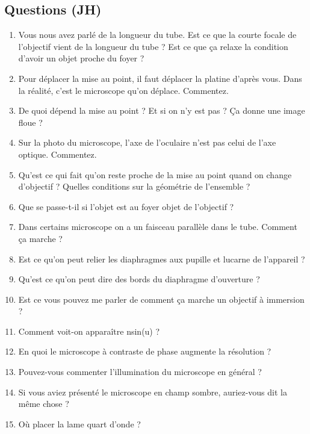 \subsection*{Questions (JH)}

\begin{enumerate}
\item Vous nous avez parlé de la longueur du tube. Est ce que la courte focale de l'objectif vient de la longueur du tube ? Est ce que ça relaxe la condition d'avoir un objet proche du foyer ?
\item Pour déplacer la mise au point, il faut déplacer la platine d'après vous. Dans la réalité, c'est le microscope qu'on déplace. Commentez.
\item De quoi dépend la mise au point ? Et si on n'y est pas ? Ça donne une image floue ?
\item Sur la photo du microscope, l'axe de l'oculaire n'est pas celui de l'axe optique. Commentez.
\item Qu'est ce qui fait qu'on reste proche de la mise au point quand on change d'objectif ? Quelles conditions sur la géométrie de l'ensemble ?
\item Que se passe-t-il si l'objet est au foyer objet de l'objectif ?
\item Dans certains microscope on a un faisceau parallèle dans le tube. Comment ça marche ?
\item Est ce qu'on peut relier les diaphragmes aux pupille et lucarne de l'appareil ?
\item Qu'est ce qu'on peut dire des bords du diaphragme d'ouverture ?
\item Est ce vous pouvez me parler de comment ça marche un objectif à immersion ?
\item Comment voit-on apparaître nsin(u) ?
\item En quoi le microscope à contraste de phase augmente la résolution ?
\item Pouvez-vous commenter l'illumination du microscope en général ?
\item Si vous aviez présenté le microscope en champ sombre, auriez-vous dit la même chose ?
\item Où placer la lame quart d'onde ?
\end{enumerate}

\newpage